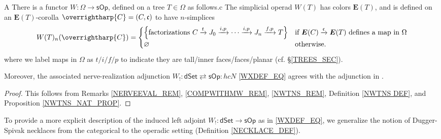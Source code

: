 \documentclass[a4paper,10pt
,draft
]{article}%
\numberwithin{equation}{section}
\numberwithin{figure}{section}
\theoremstyle{definition} %
\newcommand{\vect}[1]{\text{\overrightharp{\ensuremath{#1}}}}
\newcommand{\sOp}{\ensuremath{\mathsf{sOp}}}%
\newcommand{\dSet}{\mathsf{dSet}}
\newcommand{\1}{\ensuremath{\mathbbm 1}}%
\begin{document}
\begin{customprop}{A}
        \label{WU_THM}
        There is a functor $W \colon \Omega \to \sOp$,
        defined on a tree $T \in \Omega$ as follows.c
        The simplicial operad $W(T)$ has colors $\boldsymbol{E}(T)$, and
        is defined on an $\boldsymbol{E}(T)$-corolla 
        $\vect{C} = (C,\mathfrak{c})$
        to have $n$-simplices 
        \begin{equation}\label{WU_EQ}
                W(T)_n(\vect C) =
                \begin{cases}
                        \left\{\text{factorizations }
                                C \xrightarrow{t} 
                                J_0 \xrightarrow{i,p} 
                                \cdots \xrightarrow{i,p}
                                J_n \xrightarrow{f,p} T
                        \right\}
                        &
                        \mbox{if $\boldsymbol{E}(C) \xrightarrow{\mathfrak{c}} \boldsymbol{E}(T)$ defines a map in $\Omega$}
                        \\
                        \varnothing
                        &
                        \mbox{otherwise.}
                \end{cases}
        \end{equation}
        where we label maps in $\Omega$ as
        $t/i/f/p$
        to indicate they are 
        tall/inner faces/faces/planar
        (cf. \S \ref{TREES_SEC}).

        Moreover, the associated nerve-realization adjunction $W_! \colon \dSet \rightleftarrows \sOp \colon hcN$ \eqref{WXDEF_EQ}
        agrees with the adjunction in \cite{MW09,CM13b}.
\end{customprop}
\begin{proof}
        This follows from Remarks \ref{NERVEEVAL_REM}, \ref{COMPWITHMW_REM}, \ref{NWTNS_REM}, Definition \ref{NWTNS DEF}, and Proposition \ref{NWTNS_NAT_PROP}.
\end{proof}

To provide a more explicit description of the induced left adjoint $W_! \colon \dSet \to \sOp$ as in \eqref{WXDEF_EQ},
we generalize the notion of Dugger-Spivak necklaces \cite{DS11} from the categorical to the operadic setting (Definition \ref{NECKLACE_DEF}).
\end{document}
